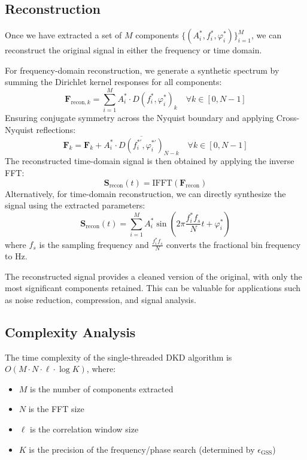 \documentclass[11pt,twoside]{report}
\numberwithin{thm}{section}
\numberwithin{equation}{section}
\begin{document}
\subsection{Reconstruction}
\label{subsubsec:reconstruction}

Once we have extracted a set of $M$ components $\{(A_i^*, f_i^*, \varphi_i^*)\}_{i=1}^M$, we can reconstruct the original signal in either the frequency or time domain.

For frequency-domain reconstruction, we generate a synthetic spectrum by summing the Dirichlet kernel responses for all components:
\begin{equation}
\mathbf{F}_{\text{recon},k} = \sum_{i=1}^{M} A_i^* \cdot D(f_i^*, \varphi_i^*)_k \quad \forall k \in [0, N-1]
\end{equation}
Ensuring conjugate symmetry across the Nyquist boundary and applying Cross-Nyquist reflections:
\begin{equation}
\mathbf{F}_{k} =\mathbf{F}_{k} + \overline{A_i^*\cdot D(f^{*'}_i, \varphi^{*'}_i)_{N-k}} \quad \forall k \in [0, N-1]
\end{equation}
The reconstructed time-domain signal is then obtained by applying the inverse FFT:
\begin{equation}
\mathbf{S}_{\text{recon}}(t) = \text{IFFT}(\mathbf{F}_{\text{recon}})
\end{equation}
Alternatively, for time-domain reconstruction, we can directly synthesize the signal using the extracted parameters:
\begin{equation}
\mathbf{S}_{\text{recon}}(t) = \sum_{i=1}^{M} A_i^* \sin(2\pi \frac{f_i^* f_s}{N} t + \varphi_i^*)
\end{equation}
where $f_s$ is the sampling frequency and $\frac{f_i^* f_s}{N}$ converts the fractional bin frequency to Hz.

The reconstructed signal provides a cleaned version of the original, with only the most significant components retained. This can be valuable for applications such as noise reduction, compression, and signal analysis.

\subsection{Complexity Analysis}

The time complexity of the single-threaded DKD algorithm is $O(M \cdot N \cdot \ell \cdot \log K)$, where:
\begin{itemize}
    \item $M$ is the number of components extracted
    \item $N$ is the FFT size
    \item $\ell$ is the correlation window size
    \item $K$ is the precision of the frequency/phase search (determined by $\epsilon_{\text{GSS}}$)
\end{itemize}
\end{document}
